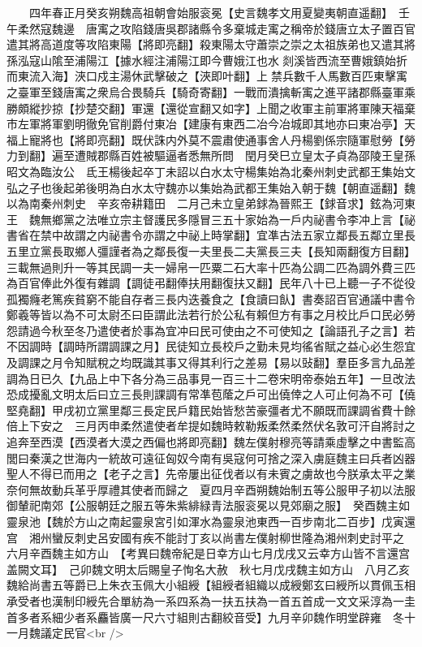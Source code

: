　　四年春正月癸亥朔魏高祖朝會始服衮冕【史言魏孝文用夏變夷朝直遥翻】　壬午柔然寇魏邊　唐㝢之攻陷錢唐吳郡諸縣令多棄城走㝢之稱帝於錢唐立太子置百官遣其將高道度等攻陷東陽【將即亮翻】殺東陽太守蕭崇之崇之太祖族弟也又遣其將孫泓寇山隂至浦陽江【據水經注浦陽江即今曹娥江也水剡溪皆西流至曹娥鎮始折而東流入海】浹口戍主湯休武擊破之【浹即叶翻】上禁兵數千人馬數百匹東擊㝢之臺軍至錢唐㝢之衆烏合畏騎兵【騎奇寄翻】一戰而潰擒斬㝢之進平諸郡縣臺軍乘勝頗縱抄掠【抄楚交翻】軍還【還從宣翻又如字】上聞之收軍主前軍將軍陳天福棄市左軍將軍劉明徹免官削爵付東冶【建康有東西二冶今冶城即其地亦曰東冶亭】天福上寵將也【將即亮翻】既伏誅内外莫不震肅使通事舍人丹楊劉係宗隨軍慰勞【勞力到翻】遍至遭賊郡縣百姓被驅逼者悉無所問　閏月癸巳立皇太子貞為邵陵王皇孫昭文為臨汝公　氐王楊後起卒丁未詔以白水太守楊集始為北秦州刺史武都王集始文弘之子也後起弟後明為白水太守魏亦以集始為武都王集始入朝于魏【朝直遥翻】魏以為南秦州刺史　辛亥帝耕籍田　二月己未立皇弟銶為晉熙王【銶音求】鉉為河東王　魏無鄉黨之法唯立宗主督護民多隱冒三五十家始為一戶内祕書令李冲上言【祕書省在禁中故謂之内祕書令亦謂之中祕上時掌翻】宜凖古法五家立鄰長五鄰立里長五里立黨長取鄉人彊謹者為之鄰長復一夫里長二夫黨長三夫【長知兩翻復方目翻】三載無過則升一等其民調一夫一婦帛一匹粟二石大率十匹為公調二匹為調外費三匹為百官俸此外復有雜調【調徒弔翻俸扶用翻復扶又翻】民年八十已上聽一子不從役孤獨癃老篤疾貧窮不能自存者三長内迭養食之【食讀曰飤】書奏詔百官通議中書令鄭羲等皆以為不可太尉丕曰臣謂此法若行於公私有賴但方有事之月校比戶口民必勞怨請過今秋至冬乃遣使者於事為宜冲曰民可使由之不可使知之【論語孔子之言】若不因調時【調時所謂調課之月】民徒知立長校戶之勤未見均徭省賦之益心必生怨宜及調課之月令知賦稅之均既識其事又得其利行之差易【易以䜴翻】羣臣多言九品差調為日已久【九品上中下各分為三品事見一百三十二卷宋明帝泰始五年】一旦改法恐成擾亂文明太后曰立三長則課調有常凖苞䕃之戶可出僥倖之人可止何為不可【僥堅堯翻】甲戌初立黨里鄰三長定民戶籍民始皆愁苦豪彊者尤不願既而課調省費十餘倍上下安之　三月丙申柔然遣使者牟提如魏時敕勒叛柔然柔然伏名敦可汗自將討之追奔至西漠【西漠者大漠之西偏也將即亮翻】魏左僕射穆亮等請乘虛擊之中書監高閭曰秦漢之世海内一統故可遠征匈奴今南有吳寇何可捨之深入虜庭魏主曰兵者凶器聖人不得已而用之【老子之言】先帝屢出征伐者以有未賓之虜故也今朕承太平之業奈何無故動兵革乎厚禮其使者而歸之　夏四月辛酉朔魏始制五等公服甲子初以法服御輦祀南郊【公服朝廷之服五等朱紫緋緑青法服衮冕以見郊廟之服】　癸酉魏主如靈泉池【魏於方山之南起靈泉宮引如渾水為靈泉池東西一百步南北二百步】戊寅還宫　湘州蠻反刺史呂安國有疾不能討丁亥以尚書左僕射柳世隆為湘州刺史討平之　六月辛酉魏主如方山　【考異曰魏帝紀是日幸方山七月戊戌又云幸方山皆不言還宫盖闕文耳】　己卯魏文明太后賜皇子恂名大赦　秋七月戊戌魏主如方山　八月乙亥魏給尚書五等爵已上朱衣玉佩大小組綬【組綬者組織以成綬鄭玄曰綬所以貫佩玉相承受者也漢制印綬先合單紡為一系四系為一扶五扶為一首五首成一文文采淳為一圭首多者系細少者系麤皆廣一尺六寸組則古翻絞音受】九月辛卯魏作明堂辟雍　冬十一月魏議定民官<br />
